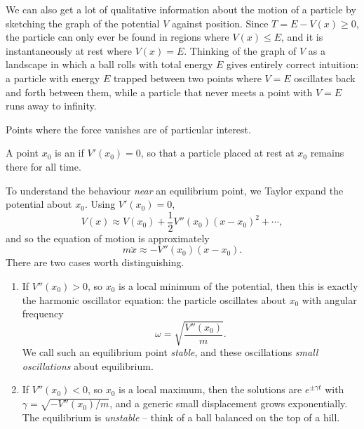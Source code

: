 We can also get a lot of qualitative information about the motion of a particle by sketching the graph of the potential $V$ against position. Since $T = E - V(x) \geq 0$, the particle can only ever be found in regions where $V(x) \leq E$, and it is instantaneously at rest where $V(x) = E$. Thinking of the graph of $V$ as a landscape in which a ball rolls with total energy $E$ gives entirely correct intuition: a particle with energy $E$ trapped between two points where $V = E$ oscillates back and forth between them, while a particle that never meets a point with $V = E$ runs away to infinity.

\begin{center}
\end{center}

Points where the force vanishes are of particular interest.

\begin{definition}
	A point $x_0$ is an  if $V'(x_0) = 0$, so that a particle placed at rest at $x_0$ remains there for all time.
\end{definition}

To understand the behaviour \emph{near} an equilibrium point, we Taylor expand the potential about $x_0$. Using $V'(x_0) = 0$,
$$
V(x) \approx V(x_0) + \frac{1}{2}V''(x_0)(x - x_0)^2 + \cdots,
$$
and so the equation of motion is approximately
$$
m \ddot{x} \approx -V''(x_0) (x - x_0).
$$
There are two cases worth distinguishing.
\begin{enumerate}[label=(\roman*)]
	\item If $V''(x_0) > 0$, so $x_0$ is a local minimum of the potential, then this is exactly the harmonic oscillator equation: the particle oscillates about $x_0$ with angular frequency
	$$
	\omega = \sqrt{\frac{V''(x_0)}{m}}.
	$$
	We call such an equilibrium point \emph{stable}, and these oscillations \emph{small oscillations} about equilibrium.
	\item If $V''(x_0) < 0$, so $x_0$ is a local maximum, then the solutions are $e^{\pm \gamma t}$ with $\gamma = \sqrt{-V''(x_0)/m}$, and a generic small displacement grows exponentially. The equilibrium is \emph{unstable} -- think of a ball balanced on the top of a hill.
\end{enumerate}

